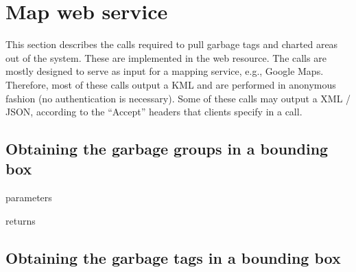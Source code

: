 \section{Map web service}
\label{sec:call:map}

This section describes the calls required to pull garbage tags and charted areas
out of the system. These are implemented in the
 web resource. The
calls are mostly designed to serve as input for a mapping service, e.g., Google
Maps. Therefore, most of these calls output a KML and are performed in
anonymous fashion (no authentication is necessary). Some of these calls may
output a XML / JSON, according to the ``Accept'' headers that clients specify
in a call.

\subsection{Obtaining the garbage groups in a bounding box}

\begin{apidata}{parameters}
  \begin{datalist}
  \end{datalist}
\end{apidata}
\begin{apidata}{returns}
  \begin{datalist}
  \end{datalist}
\end{apidata}


\subsection{Obtaining the garbage tags in a bounding box}


